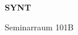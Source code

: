 \documentclass[a4paper]{article}
\begin{document}
\printGenericVSLHeader
\begin{center}
\begin{vsltext}{3cm}{4cm}

   \vspace{0.5cm} 

    \textbf{SYNT} 

    \vspace{1.5cm}

    Seminarraum 101B

\end{vsltext}

\end{center}
\end{document}
